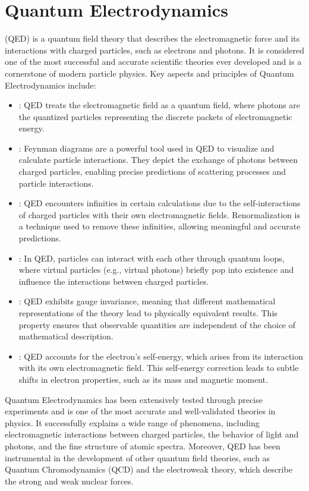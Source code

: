 \chapter{Quantum Electrodynamics}
\thispagestyle{fancy}

 (QED) is a quantum field theory that describes the electromagnetic force and its interactions with charged particles, such as electrons and photons. It is considered one of the most successful and accurate scientific theories ever developed and is a cornerstone of modern particle physics. Key aspects and principles of Quantum Electrodynamics include:

\begin{itemize}
	\item {}: QED treats the electromagnetic field as a quantum field, where photons are the quantized particles representing the discrete packets of electromagnetic energy.

	\item {}: Feynman diagrams are a powerful tool used in QED to visualize and calculate particle interactions. They depict the exchange of photons between charged particles, enabling precise predictions of scattering processes and particle interactions.

	\item {}: QED encounters infinities in certain calculations due to the self-interactions of charged particles with their own electromagnetic fields. Renormalization is a technique used to remove these infinities, allowing meaningful and accurate predictions.

	\item {}: In QED, particles can interact with each other through quantum loops, where virtual particles (e.g., virtual photons) briefly pop into existence and influence the interactions between charged particles.

	\item {}: QED exhibits gauge invariance, meaning that different mathematical representations of the theory lead to physically equivalent results. This property ensures that observable quantities are independent of the choice of mathematical description.

	\item {}: QED accounts for the electron's self-energy, which arises from its interaction with its own electromagnetic field. This self-energy correction leads to subtle shifts in electron properties, such as its mass and magnetic moment.
\end{itemize}

Quantum Electrodynamics has been extensively tested through precise experiments and is one of the most accurate and well-validated theories in physics. It successfully explains a wide range of phenomena, including electromagnetic interactions between charged particles, the behavior of light and photons, and the fine structure of atomic spectra. Moreover, QED has been instrumental in the development of other quantum field theories, such as Quantum Chromodynamics (QCD) and the electroweak theory, which describe the strong and weak nuclear forces.
